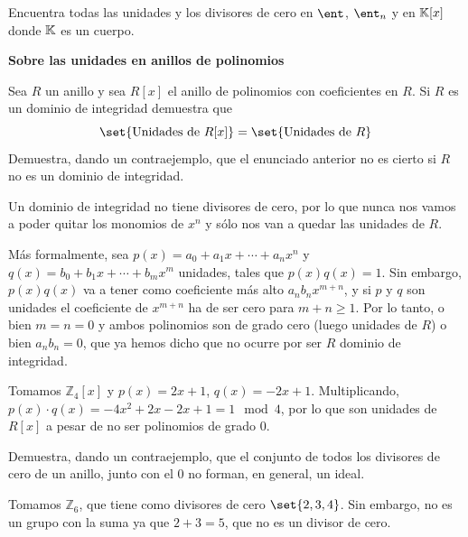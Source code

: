 \begin{problem}
Encuentra todas las unidades y los divisores de cero en $\ent$, $\ent_n$ y en $\mathbb{K}[x]$ donde $\mathbb{K}$ es un cuerpo. %
\solution
\end{problem}

\begin{problem}
{\bf Sobre las unidades en anillos de polinomios}

Sea $R$ un anillo y sea $R[x]$ el anillo de polinomios con coeficientes en $R$.
\ppart Si $R$ es un dominio de integridad demuestra que
\[ \set{\text{Unidades de } R[x]} = \set{\text{Unidades de } R} \]
\ppart Demuestra, dando un contraejemplo, que el enunciado anterior no es cierto si $R$ no es un dominio de integridad.
\solution


\spart

Un dominio de integridad no tiene divisores de cero, por lo que nunca nos vamos a poder quitar los monomios de $x^n$ y sólo nos van a quedar las unidades de $R$.

Más formalmente, sea $p(x) = a_0 + a_1 x + \dotsb + a_nx^n$ y $q(x) = b_0 + b_1 x + \dotsb + b_mx^m$ unidades, tales que $p(x) q(x) = 1$. Sin embargo, $p(x) q(x)$ va a tener como coeficiente más alto $a_n b_n x^{m+n}$, y si $p$ y $q$ son unidades el coeficiente de $x^{m+n}$ ha de ser cero para $m+n ≥ 1$. Por lo tanto, o bien $m = n = 0$ y ambos polinomios son de grado cero (luego unidades de $R$) o bien $a_n b_n = 0$, que ya hemos dicho que no ocurre por ser $R$ dominio de integridad.

\spart

Tomamos $ℤ_4[x]$ y $p(x) = 2x + 1$, $q(x) = -2x + 1$. Multiplicando, $p(x) · q(x) = -4x^2 +2x -2x + 1 = 1 \mod 4$, por lo que son unidades de $R[x]$ a pesar de no ser polinomios de grado 0.

\end{problem}

\begin{problem}
Demuestra, dando un contraejemplo, que el conjunto de todos los divisores de cero de un anillo, junto con el 0 no forman, en general, un ideal.
\solution


Tomamos $ℤ_{6}$, que tiene como divisores de cero $\set{2,3,4}$. Sin embargo, no es un grupo con la suma ya que $2 + 3 = 5$, que no es un divisor de cero.


\end{problem}

